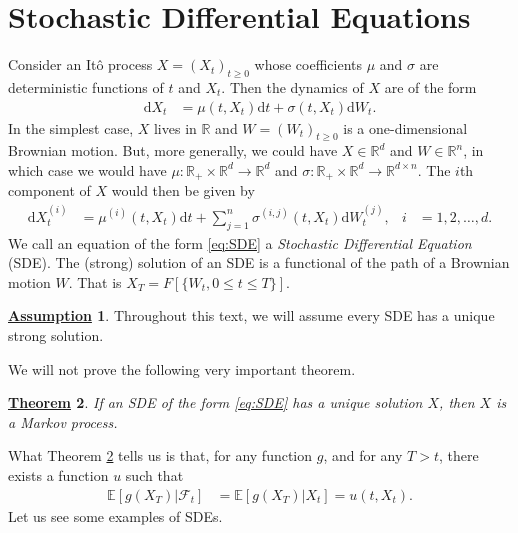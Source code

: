 \documentclass[12pt]{book}
\numberwithin{equation}{chapter}
\theoremstyle{plain}
\newtheorem{theorem}{\underline{Theorem}}
\numberwithin{theorem}{section}
\theoremstyle{definition}
\newtheorem{assumption}[theorem]{\underline{Assumption}}
\numberwithin{exercise}{chapter}
\newcommand{\<}{\langle}
\renewcommand{\>}{\rangle}
\renewcommand{\(}{\left(}
\renewcommand{\)}{\right)}
\renewcommand{\[}{\left[}
\renewcommand{\]}{\right]}
\newcommand\Eb{\mathds{E}}
\newcommand\Rb{\mathds{R}}
\newcommand\Fc{\mathscr{F}}
\newcommand\sig{\sigma}
\newcommand\dd{\mathrm{d}}
\theoremstyle{definition}
\numberwithin{question}{section}
\begin{document}
\section{Stochastic Differential Equations}

Consider an It\^o process $X = (X_t)_{t \geq 0}$ whose coefficients $\mu$ and $\sig$ are deterministic functions of $t$ and $X_t$.  Then the dynamics of $X$ are of the form
\begin{align}
\dd X_t
	&=	\mu(t,X_t) \dd t + \sig(t,X_t) \dd W_t . \label{eq:SDE}
\end{align}
In the simplest case, $X$ lives in $\Rb$ and $W = (W_t)_{t \geq 0}$ is a one-dimensional Brownian motion.  But, more generally, we could have $X \in \Rb^d$ and $W \in \Rb^n$, in which case we would have $\mu : \Rb_+ \times \Rb^d \to \Rb^d$ and $\sig : \Rb_+ \times \Rb^d \to \Rb^{d \times n}$.  The $i$th component of $X$ would then be given by
\begin{align}
\dd X_t^{(i)}
	&=	\mu^{(i)}(t,X_t)  \dd t + \sum_{j=1}^n \sig^{(i,j)}(t,X_t)  \dd W_t^{(j)} , &
i
	&=	1, 2, \ldots, d . \label{eq:SDE-d}
\end{align} 
We call an equation of the form \eqref{eq:SDE} a \textit{Stochastic Differential Equation} (SDE).  
The (strong) solution of an SDE is a functional of the path of a Brownian motion $W$.  That is $X_T = F[\{W_t,0\leq t \leq T\}]$.

\begin{assumption}
Throughout this text, we will assume every SDE has a unique strong solution.
\end{assumption}

\noindent
We will not prove the following very important theorem.

\begin{theorem}
\label{thm:sde-markov}
If an SDE of the form \eqref{eq:SDE} has a unique solution $X$, then $X$ is a Markov process.
\end{theorem}

\noindent
What Theorem \ref{thm:sde-markov} tells us is that, for any function $g$, and for any $T > t$, there exists a function $u$ such that
\begin{align}
\Eb[ g(X_T) | \Fc_t ]
	&=	\Eb[ g(X_T) | X_t ] = u(t,X_t) . \label{eq:Markov-SDE}
\end{align}
Let us see some examples of SDEs.
\end{document}
